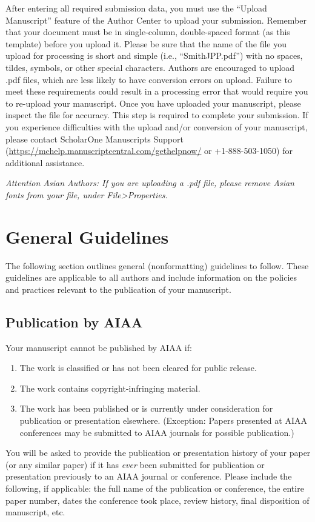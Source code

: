 \documentclass[journal ]{new-aiaa}
\begin{document}
After entering all required submission data, you must use the “Upload Manuscript” feature of the Author Center to upload your submission. Remember that your document must be in single-column, double-spaced format (as this template) before you upload it. Please be sure that the name of the file you upload for processing is short and simple (i.e., “SmithJPP.pdf”) with no spaces, tildes, symbols, or other special characters. Authors are encouraged to upload .pdf files, which are less likely to have conversion errors on upload. Failure to meet these requirements could result in a processing error that would require you to re-upload your manuscript. Once you have uploaded your manuscript, please inspect the file for accuracy. This step is required to complete your submission. If you experience difficulties with the upload and/or conversion of your manuscript, please contact ScholarOne Manuscripts Support (\url{https://mchelp.manuscriptcentral.com/gethelpnow/} or +1-888-503-1050) for additional assistance. 

\emph{Attention Asian Authors: If you are uploading a .pdf file, please remove Asian fonts from your file, under File>Properties.}

\section{General Guidelines}

The following section outlines general (nonformatting) guidelines to follow. These guidelines are applicable to all authors and include information on the policies and practices relevant to the publication of your manuscript.

\subsection{Publication by AIAA}
Your manuscript cannot be published by AIAA if:
\begin{enumerate}
\item The work is classified or has not been cleared for public release.
\item The work contains copyright-infringing material.
\item The work has been published or is currently under consideration for publication or presentation elsewhere. (Exception: Papers presented at AIAA conferences may be submitted to AIAA journals for possible publication.)
\end{enumerate}

You will be asked to provide the publication or presentation history of your paper (or any similar paper) if it has \emph{ever} been submitted for publication or presentation previously to an AIAA journal or conference. Please include the following, if applicable: the full name of the publication or conference, the entire paper number, dates the conference took place, review history, final disposition of manuscript, etc.
\end{document}
